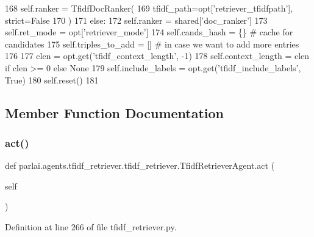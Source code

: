 \begin{DoxyCode}
168                 self.ranker = TfidfDocRanker(
169                     tfidf\_path=opt[\textcolor{stringliteral}{'retriever\_tfidfpath'}], strict=\textcolor{keyword}{False}
170                 )
171             \textcolor{keywordflow}{else}:
172                 self.ranker = shared[\textcolor{stringliteral}{'doc\_ranker'}]
173         self.ret\_mode = opt[\textcolor{stringliteral}{'retriever\_mode'}]
174         self.cands\_hash = \{\}  \textcolor{comment}{# cache for candidates}
175         self.triples\_to\_add = []  \textcolor{comment}{# in case we want to add more entries}
176 
177         clen = opt.get(\textcolor{stringliteral}{'tfidf\_context\_length'}, -1)
178         self.context\_length = clen \textcolor{keywordflow}{if} clen >= 0 \textcolor{keywordflow}{else} \textcolor{keywordtype}{None}
179         self.include\_labels = opt.get(\textcolor{stringliteral}{'tfidf\_include\_labels'}, \textcolor{keyword}{True})
180         self.reset()
181 
\end{DoxyCode}


\subsection{Member Function Documentation}
\mbox{\label{classparlai_1_1agents_1_1tfidf__retriever_1_1tfidf__retriever_1_1TfidfRetrieverAgent_a6113bcdd2792d70156ca64cc57187692}} 
\subsubsection{\texorpdfstring{act()}{act()}}
{\footnotesize\ttfamily def parlai.\+agents.\+tfidf\+\_\+retriever.\+tfidf\+\_\+retriever.\+Tfidf\+Retriever\+Agent.\+act (\begin{DoxyParamCaption}\item[{}]{self }\end{DoxyParamCaption})}



Definition at line 266 of file tfidf\+\_\+retriever.\+py.


